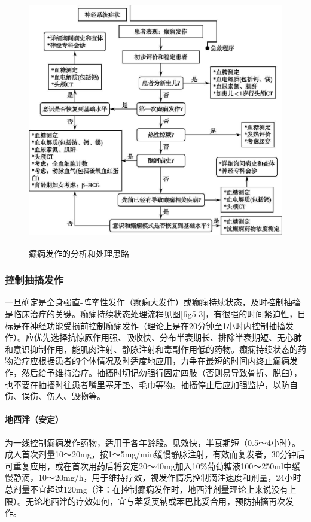 \begin{figure}[!htbp]
 \centering
 \includegraphics[width=4.77083in,height=4.34375in]{./images/Image00035.jpg}
 \captionsetup{justification=centering}
 \caption{癫痫发作的分析和处理思路}
 \label{fig5-2}
  \end{figure} 

\subsubsection{控制抽搐发作}

一旦确定是全身强直-阵挛性发作（癫痫大发作）或癫痫持续状态，及时控制抽搐是临床治疗的关键。癫痫持续状态处理流程见图\ref{fig5-3}，有很强的时间紧迫性，目标是在神经功能受损前控制癫痫发作（理论上是在20分钟至1小时内控制抽搐发作）。应优先选择抗惊厥作用强、吸收快、分布半衰期长、排除半衰期短、无心肺和意识抑制作用，能肌肉注射、静脉注射和毒副作用低的药物。癫痫持续状态的药物治疗应根据患者的个体情况及时适度地应用，力争在最短的时间内终止癫痫发作，然后给予维持治疗。抽搐时切记勿强行固定四肢（否则易导致骨折、脱臼），也不要在抽搐时往患者嘴里塞牙垫、毛巾等物。抽搐停止后应加强监护，以防自伤、误伤、伤人、毁物等。

\paragraph{地西泮（安定）}

为一线控制癫痫发作药物，适用于各年龄段。见效快，半衰期短（0.5～4小时）。成人首次剂量10～20mg，按1～5mg/min缓慢静脉注射，有效而复发者，30分钟后可重复应用，或在首次用药后将安定20～40mg加入10\%葡萄糖液100～250ml中缓慢静滴，10～20mg/h，用于维持疗效，视发作情况控制滴注速度和剂量，24小时总剂量不宜超过120mg（注：在控制癫痫发作时，地西泮剂量理论上来说没有上限）。无论地西泮的疗效如何，宜与苯妥英钠或苯巴比妥合用，预防抽搐再次发作。

